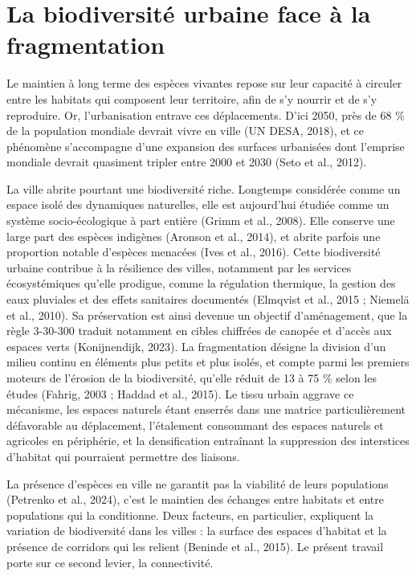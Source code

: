 \documentclass[a4paper,12pt]{report}
\begin{document}
\section{La biodiversité urbaine face à la fragmentation}
Le maintien à long terme des espèces vivantes repose sur leur capacité à circuler entre les habitats qui composent leur territoire, afin de s'y nourrir et de s'y reproduire. Or, l'urbanisation entrave ces déplacements. D'ici 2050, près de 68 \% de la population mondiale devrait vivre en ville (UN DESA, 2018), et ce phénomène s'accompagne d'une expansion des surfaces urbanisées dont l'emprise mondiale devrait quasiment tripler entre 2000 et 2030 (Seto et al., 2012).

La ville abrite pourtant une biodiversité riche. Longtemps considérée comme un espace isolé des dynamiques naturelles, elle est aujourd'hui étudiée comme un système socio-écologique à part entière (Grimm et al., 2008). Elle conserve une large part des espèces indigènes (Aronson et al., 2014), et abrite parfois une proportion notable d'espèces menacées (Ives et al., 2016). Cette biodiversité urbaine contribue à la résilience des villes, notamment par les services écosystémiques qu'elle prodigue, comme la régulation thermique, la gestion des eaux pluviales et des effets sanitaires documentés (Elmqvist et al., 2015 ; Niemelä et al., 2010). Sa préservation est ainsi devenue un objectif d'aménagement, que la règle 3-30-300 traduit notamment en cibles chiffrées de canopée et d'accès aux espaces verts (Konijnendijk, 2023). La fragmentation désigne la division d'un milieu continu en éléments plus petits et plus isolés, et compte parmi les premiers moteurs de l'érosion de la biodiversité, qu'elle réduit de 13 à 75 \% selon les études (Fahrig, 2003 ; Haddad et al., 2015). Le tissu urbain aggrave ce mécanisme, les espaces naturels étant enserrés dans une matrice particulièrement défavorable au déplacement, l'étalement consommant des espaces naturels et agricoles en périphérie, et la densification entraînant la suppression des interstices d'habitat qui pourraient permettre des liaisons.

La présence d'espèces en ville ne garantit pas la viabilité de leurs populations (Petrenko et al., 2024), c'est le maintien des échanges entre habitats et entre populations qui la conditionne. Deux facteurs, en particulier, expliquent la variation de biodiversité dans les villes : la surface des espaces d'habitat et la présence de corridors qui les relient (Beninde et al., 2015). Le présent travail porte sur ce second levier, la connectivité.
\end{document}

